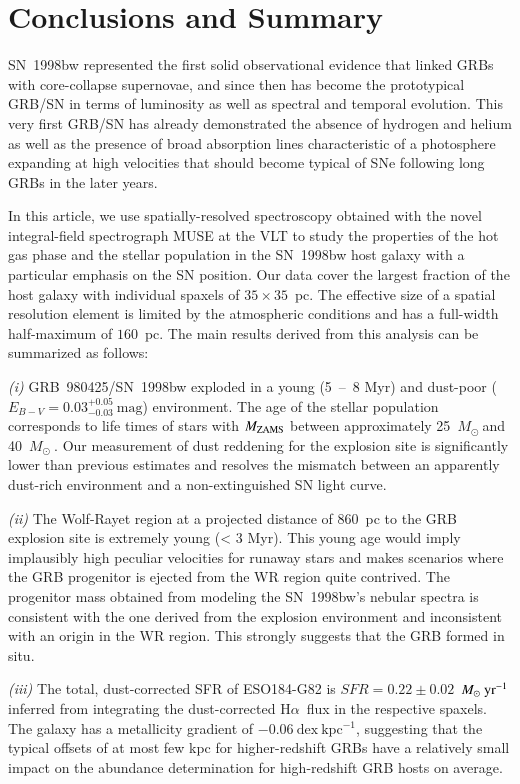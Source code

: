 \documentclass[traditabstract, referee]{aa}
\newcommand{\ha}{H$\alpha$}
\newcommand{\Msun}{$M_\odot~$}
\newcommand{\Msunyr}{$M_\odot~\rm{yr}^{-1}$}
\begin{document}
\section{Conclusions and Summary}

SN~1998bw represented the first solid observational evidence that linked GRBs with core-collapse supernovae, and since then has become the prototypical GRB/SN in terms of luminosity as well as spectral and temporal evolution. This very first GRB/SN has already demonstrated the absence of hydrogen and helium as well as the presence of broad absorption lines characteristic of a photosphere expanding at high velocities that should become typical of SNe following long GRBs in the later years.

In this article, we use spatially-resolved spectroscopy obtained with the novel integral-field spectrograph MUSE at the VLT to study the properties of the hot gas phase and the stellar population in the SN~1998bw host galaxy with a particular {emphasis} on the SN position. Our data cover the largest fraction of the host galaxy with individual spaxels of $35 \times 35$~pc. The effective size of a spatial resolution element is limited by the atmospheric conditions and has a full-width half-maximum of {$160$~pc}. The main results derived from this analysis can be summarized as follows:

\textit{(i)} GRB~980425/SN~1998bw exploded in a young (5~--~8 Myr) and dust-poor ($E_{B-V} = 0.03_{-0.03}^{+0.05}~\mathrm{mag}$) environment. The age of the stellar population corresponds to life times of stars with $M_{\rm{ZAMS}}$  between approximately 25~\Msun and 40~\Msun. Our measurement of dust reddening for the explosion site is significantly lower than previous estimates and resolves the mismatch between an apparently dust-rich environment and a non-extinguished SN light curve.

\textit{(ii)} The Wolf-Rayet region at a projected distance of 860~pc to the GRB explosion site is extremely young (< 3 Myr). This young age would imply implausibly high peculiar velocities for runaway stars and makes scenarios where the GRB progenitor is ejected from the WR region quite contrived. The progenitor mass obtained from modeling the SN~1998bw's nebular spectra \citep{2006ApJ...640..854M} is consistent with the one derived from the explosion environment and inconsistent with an origin in the WR region. This strongly suggests that the GRB formed in situ.

\textit{(iii)} The total, dust-corrected SFR of ESO184-G82 is $SFR=0.22\pm0.02$~\Msunyr inferred from integrating the dust-corrected \ha~flux in the respective spaxels. The galaxy has a metallicity gradient of $-0.06~\mathrm{dex~kpc^{-1}}$, suggesting that the typical offsets of at most few kpc for higher-redshift GRBs have a relatively small impact on the abundance determination for high-redshift GRB hosts on average.
\end{document}
